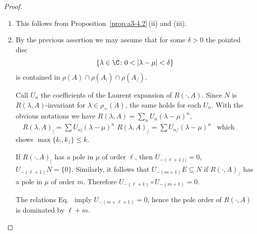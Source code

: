 \begin{proof}
\begin{enumerate}[\upshape (i), wide, labelindent=.25em]
\item 
This follows from Proposition~\ref{prop:a3-4.2}\,(ii) and (iii).

\item 
By the previous assertion we may assume that for some $\delta > 0$ the pointed disc
\[
\{\lambda \in \C \colon 0 < |\lambda-\mu| < \delta\}
\]
is contained in $\rho(A) \cap \rho(A_{|}) \cap \rho(A_{/})$.

Call $U_{n}$ the coefficients of the Laurent expansion of\/ $R(\cdot,A)$.
Since $N$ is $R(\lambda,A)$-invariant for $\lambda \in \rho_{+}(A)$, the same holds for each $U_{n}$.
With the obvious notations we have \quad
$R(\lambda,A) = \sum_{n} U_{n}(\lambda-\mu)^{n}$, $\quad R(\lambda,A)_{|} = \sum U_{n|}(\lambda-\mu)^{n}$ \quad {} \quad $R(\lambda,A)_{/} = \sum U_{n/}(\lambda-\mu)^{n}$~
which shows $\max\{k_{|},k_{/}\} \leq k$.

If\/ $R(\cdot,A)_{|}$ has a pole in $\mu$ of order $\ell$, then $U_{-(\ell+1)|} = 0$, \ie $U_{-(\ell+1)}N = \{0\}$.
Similarly, it follows that $U_{-(m+1)}E \subseteq N$ if\/ $R(\cdot,A)_{/}$ has a pole in $\mu$ of order $m$.
Therefore $U_{-(\ell+1)} \circ U_{-(m+1)} = 0$.

The relations Eq.~ imply $U_{-(m+\ell+1)} = 0$, hence the pole order of\/ $R(\cdot,A)$ is dominated by $\ell + m$.
\qedhere
\end{enumerate}
\end{proof}
